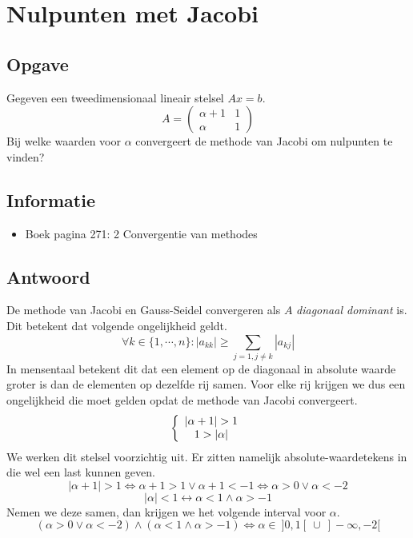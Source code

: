 \documentclass[examenvragen.tex]{subfiles}
\begin{document}
\section{Nulpunten met Jacobi}
\subsection{Opgave}
Gegeven een tweedimensionaal lineair stelsel $Ax=b$.
\[
A = \begin{pmatrix}
\alpha + 1 & 1 \\
\alpha &1
\end{pmatrix}
\]
Bij welke waarden voor $\alpha$ convergeert de methode van Jacobi om nulpunten te vinden?
\subsection{Informatie}
\begin{itemize}
\item Boek pagina 271: 2 Convergentie van methodes
\end{itemize}
\subsection{Antwoord}
De methode van Jacobi en Gauss-Seidel convergeren als $A$ \emph{diagonaal dominant} is. Dit betekent dat volgende ongelijkheid geldt.
\[
\forall k \in \{1,\cdots,n\}: |a_{kk}| \ge \sum_{j=1,j\neq k}|a_{kj}|
\]
In mensentaal betekent dit dat een element op de diagonaal in absolute waarde groter is dan de elementen op dezelfde rij samen.
Voor elke rij krijgen we dus een ongelijkheid die moet gelden opdat de methode van Jacobi convergeert.
\[
\left\{
\begin{array}{c c}
|\alpha +1| > 1\\
1 > |\alpha|
\end{array}
\right.
\]
We werken dit stelsel voorzichtig uit. Er zitten namelijk absolute-waardetekens in die wel een last kunnen geven.
\[
|\alpha+1|>1 \Leftrightarrow \alpha + 1 > 1 \vee \alpha + 1 < -1 \Leftrightarrow \alpha > 0 \vee \alpha < -2
\]
\[
|\alpha|<1 \leftrightarrow \alpha < 1 \wedge \alpha > -1
\]
Nemen we deze samen, dan krijgen we het volgende interval voor $\alpha$.
\[
(\alpha > 0 \vee \alpha < -2) \wedge (\alpha < 1 \wedge \alpha > -1) \Leftrightarrow \alpha \in\ ]0,1[\ \cup\ ]-\infty,-2[
\]
\end{document}
